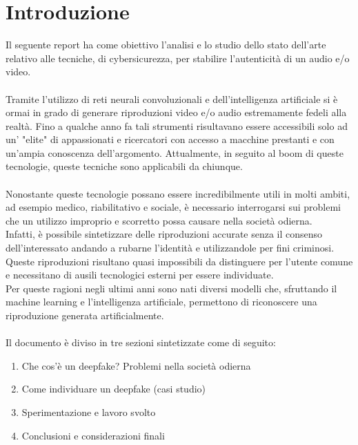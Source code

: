 \documentclass[12pt, a4paper]{article}
\begin{document}


\newpage

\section{Introduzione}
Il seguente report ha come obiettivo l'analisi e lo studio dello stato dell'arte relativo alle tecniche, di cybersicurezza, per stabilire l'autenticità di un audio e/o video. \\\\
Tramite l'utilizzo di reti neurali convoluzionali e dell'intelligenza artificiale si è ormai in grado di generare riproduzioni video e/o audio estremamente fedeli alla realtà. Fino a qualche anno fa tali strumenti risultavano essere accessibili solo ad un' "elite" di appassionati e ricercatori con accesso a macchine prestanti e con un'ampia conoscenza dell'argomento. Attualmente, in seguito al boom di queste tecnologie, queste tecniche sono applicabili da chiunque.
\\\\
Nonostante queste tecnologie possano essere incredibilmente utili in molti ambiti, ad esempio medico, riabilitativo e sociale, è necessario interrogarsi sui problemi che un utilizzo improprio e scorretto possa causare nella società odierna.\\
Infatti, è possibile sintetizzare delle riproduzioni accurate senza il consenso dell'interessato andando a rubarne l'identità e utilizzandole per fini criminosi.
Queste riproduzioni risultano quasi impossibili da distinguere per l'utente comune e necessitano di ausili tecnologici esterni per essere individuate. \\
Per queste ragioni negli ultimi anni sono nati diversi modelli che, sfruttando il machine learning e l'intelligenza artificiale, permettono di riconoscere una riproduzione generata artificialmente. 
\\\\
Il documento è diviso in tre sezioni sintetizzate come di seguito: 
\begin{enumerate}
    \item Che cos'è un deepfake? Problemi nella società odierna
    \item Come individuare un deepfake (casi studio)
    \item Sperimentazione e lavoro svolto
    \item Conclusioni e considerazioni finali
\end{enumerate}
\end{document}
